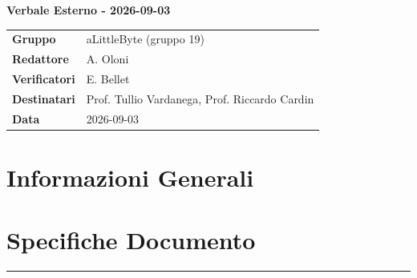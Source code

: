 \documentclass[a4paper,12pt]{article}
\begin{document}
\thispagestyle{firstpage}

\vspace*{0.5cm}

\begin{center}
    {\LARGE \textbf{Verbale Esterno - 2026-09-03}}
\end{center}

\vspace{1.5cm}

\begin{center}
    \renewcommand{\arraystretch}{1.3}
    \begin{tcolorbox}[
        width=0.92\textwidth,
        colback=gray!6,
        colframe=gray!45,
        boxrule=0.5pt,
        arc=2mm,
        boxsep=0pt,
        left=8pt, right=8pt, top=8pt, bottom=8pt
    ]
        \begin{tabularx}{\linewidth}{>{\bfseries}p{3.5cm} X}
            Gruppo      & aLittleByte (gruppo 19) \\
            Redattore   & A. Oloni \\
            Verificatori& E. Bellet\\
            Destinatari & Prof. Tullio Vardanega, Prof. Riccardo Cardin \\
            Data        & 2026-09-03\\
        \end{tabularx}
    \end{tcolorbox}
\end{center}

\newpage

\tableofcontents
\newpage

\section{Informazioni Generali}
\section*{Specifiche Documento}
\hrule
\vspace{1cm}
\end{document}
